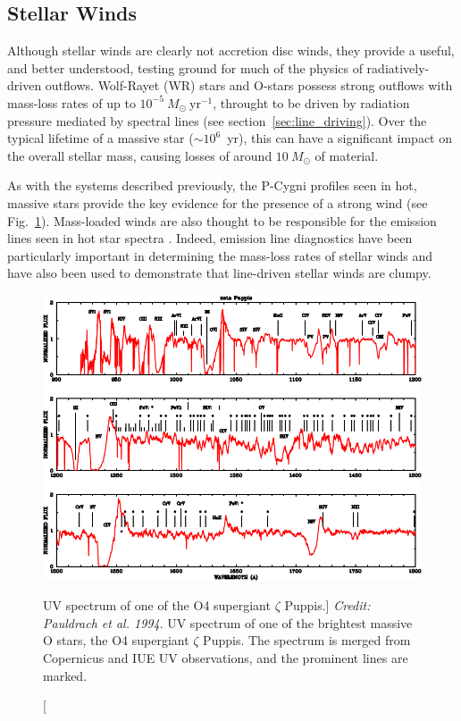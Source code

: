 \subsection{Stellar Winds}

\label{sec:stellar_winds}

Although stellar winds are clearly not accretion disc winds,
they provide a useful, and better understood, testing ground for much
of the physics of radiatively-driven outflows. 
Wolf-Rayet (WR) stars and O-stars possess strong outflows with mass-loss rates
of up to $10^{-5}~M_\odot~$yr$^{-1}$, throught to be driven by radiation pressure
mediated by spectral lines (see section~\ref{sec:line_driving}). 
Over the typical lifetime of a massive
star ($\sim10^6$~yr), this can have a significant impact on the overall stellar mass,
causing losses of around $10~M_\odot$ of material. 

As with the systems described previously, the P-Cygni profiles
seen in hot, massive stars provide the key evidence for the presence of
a strong wind (see Fig.~\ref{fig:hot_star_wind}). Mass-loaded
winds are also thought to be responsible for the emission lines 
seen in hot star spectra \citep[e.g.][]{pauldrach1994}. Indeed, emission
line diagnostics have been particularly important in determining
the mass-loss rates of stellar winds and have also been used to demonstrate 
that line-driven stellar winds are clumpy. 

\begin{figure}
\centering
\includegraphics[width=1.0\textwidth]{figures/02-outflows/hot_star_wind.png}
\caption
[UV spectrum of one of the O4 supergiant $\zeta$ Puppis.]
{
{\sl Credit: Pauldrach et al. 1994}. 
UV spectrum of one of the brightest massive O stars, 
the O4 supergiant $\zeta$ Puppis. The spectrum is merged from 
Copernicus and IUE UV observations, and the prominent lines are 
marked.
} 
\label{fig:hot_star_wind}
\end{figure}

